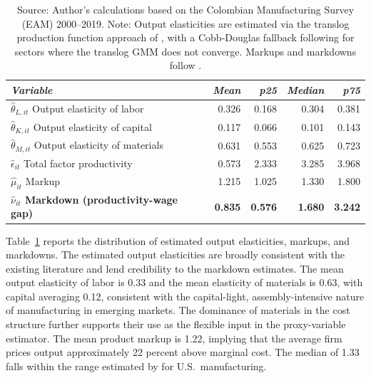 \documentclass[12pt]{article}
\begin{document}
\begin{table}[H]
\centering
\caption{\label{tab:parameters}Production Function Parameters}
\begin{tabular}{lrrrr}
\toprule
\textit{Variable}& \textit{Mean} & \textit{p25}  & \textit{Median} & \textit{p75} \\
\midrule
\addlinespace[0.3em]
\hspace{1em}$\hat{\theta}_{L,it}$ Output elasticity of labor & 0.326 & 0.168 & 0.304 & 0.381 \\
\hspace{1em}$\hat{\theta}_{K,it}$ Output elasticity of capital & 0.117 & 0.066 & 0.101 & 0.143 \\
\hspace{1em}$\hat{\theta}_{M,it}$ Output elasticity of materials & 0.631 & 0.553 & 0.625 & 0.723\\
\hspace{1em}$\hat{\epsilon}_{it}$ Total factor productivity & 0.573 & 2.333 & 3.285 & 3.968\\
\hspace{1em}$\hat{\mu}_{it}$ Markup & 1.215 & 1.025 & 1.330 & 1.800\\
\hspace{1em}\textbf{$\hat{\nu}_{it}$ Markdown (productivity-wage gap)} & \textbf{0.835} & \textbf{0.576} & \textbf{1.680} & \textbf{3.242}\\
\bottomrule
\end{tabular}
\caption*{\footnotesize Source: Author's calculations based on the Colombian Manufacturing Survey (EAM) 2000--2019. 
Note: Output elasticities are estimated via the translog production function approach of 
\cite{de_loecker_rise_2020}, with a Cobb-Douglas fallback following \cite{ackerberg_identification_2015} for sectors where the translog GMM does not converge. Markups and markdowns follow \cite{yeh_monopsony_2022}.}
\end{table}

Table~\ref{tab:parameters} reports the distribution of estimated output elasticities, markups, and markdowns. The estimated output elasticities are broadly consistent with the existing literature and lend credibility to the markdown estimates. The mean output elasticity of labor is 0.33 and the mean elasticity of materials is 0.63, with capital averaging 0.12, consistent with the capital-light, assembly-intensive nature of manufacturing in emerging markets. The dominance of materials in the cost structure further supports their use as the flexible input in the proxy-variable estimator. The mean product markup is 1.22, implying that the average firm prices output approximately 22 percent above marginal cost. The median of 1.33 falls within the range estimated by \textcite{de_loecker_rise_2020} for U.S.\ manufacturing.
\end{document}
